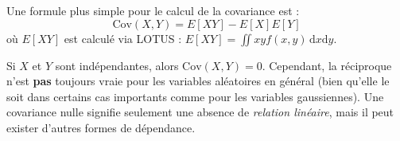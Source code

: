 \begin{theorembox}
Une formule plus simple pour le calcul de la covariance est :
$$ \text{Cov}(X, Y) = E[XY] - E[X]E[Y] $$
où $E[XY]$ est calculé via LOTUS : $E[XY] = \iint xy f(x, y) \, \mathrm{d}x \mathrm{d}y$.
\end{theorembox}

\begin{remarquebox}
Si $X$ et $Y$ sont indépendantes, alors $\text{Cov}(X, Y) = 0$. Cependant, la réciproque n'est \textbf{pas} toujours vraie pour les variables aléatoires en général (bien qu'elle le soit dans certains cas importants comme pour les variables gaussiennes). Une covariance nulle signifie seulement une absence de \textit{relation linéaire}, mais il peut exister d'autres formes de dépendance.
\end{remarquebox}